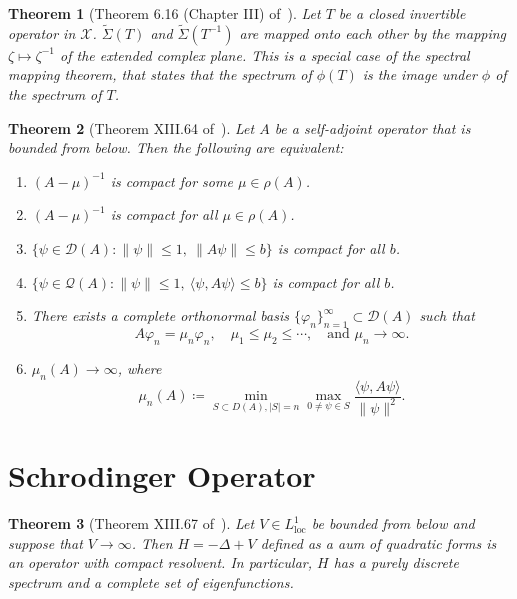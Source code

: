 \documentclass[a4paper, notitlepage, 10pt]{article}
\newcommand{\Space}{\mathcal{X}}
\newtheorem{theorem}{Theorem}[section]
\theoremstyle{definition}
\theoremstyle{customstyle}
\theoremstyle{definition}
\theoremstyle{remark}
\begin{document}
\begin{theorem}[Theorem 6.16 (Chapter III) of~\cite{kato2013perturbation}]
    Let $T$ be a closed invertible operator in $\Space$.
    $\tilde{\Sigma}(T)$ and $\tilde{\Sigma}(T^{-1})$ are mapped onto each other by the mapping $\zeta \mapsto \zeta^{-1}$ of the extended complex plane. 
    This is a special case of the spectral mapping theorem, that states that the spectrum of $\phi(T)$ is the image under $\phi$ of the spectrum of $T$.
\end{theorem}

\begin{theorem}[Theorem XIII.64 of~\cite{reed1972methodsIV}]
    Let \( A \) be a self-adjoint operator that is bounded from below. Then the following are equivalent:
    \begin{enumerate}
        \item \( (A - \mu)^{-1} \) is compact for some \( \mu \in \rho(A) \).
        \item \( (A - \mu)^{-1} \) is compact for all \( \mu \in \rho(A) \).
        \item \( \{ \psi \in \mathcal{D}(A) : \|\psi\| \leq 1,\ \|A\psi\| \leq b \} \) is compact for all \( b \).
        \item \( \{ \psi \in \mathcal{Q}(A) : \|\psi\| \leq 1,\ \langle \psi, A\psi \rangle \leq b \} \) is compact for all \( b \).
        \item There exists a complete orthonormal basis \( \{ \varphi_n \}_{n=1}^\infty \subset \mathcal{D}(A) \) such that
        \[
        A \varphi_n = \mu_n \varphi_n,\quad \mu_1 \leq \mu_2 \leq \cdots,\quad \text{and } \mu_n \to \infty.
        \]
        \item $\mu_n(A) \to \infty$, where 
        \[
        \mu_n(A) \coloneqq \min_{S \subset D(A), |S|=n} \max_{0 \neq \psi \in S} \frac{\langle \psi, A\psi \rangle}{\|\psi\|^2}.
        \]
    \end{enumerate}
\end{theorem}


\section{Schrodinger Operator}

\begin{theorem}[Theorem XIII.67 of~\cite{reed1972methodsIV}]
    Let $V \in L_{\mathrm{loc}}^1$ be bounded from below and suppose that $V \to \infty$.
    Then $H = -\Delta + V$ defined as a aum of quadratic forms is an operator with compact resolvent.
    In particular, $H$ has a purely discrete spectrum and a complete set of eigenfunctions.
\end{theorem}




\end{document}
